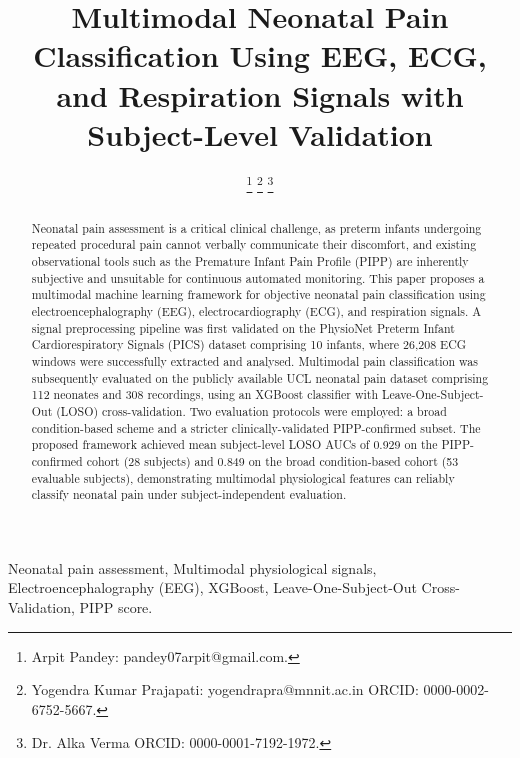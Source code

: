 \documentclass[conference]{IEEEtran}
\begin{document}
\title{ Multimodal Neonatal Pain Classification Using EEG, ECG, and Respiration Signals with Subject-Level Validation\\}


\author{


\thanks{Arpit Pandey: pandey07arpit@gmail.com.}
\thanks{Yogendra Kumar Prajapati: yogendrapra@mnnit.ac.in ORCID: 0000-0002-6752-5667.}
\thanks{Dr. Alka Verma ORCID: 0000-0001-7192-1972.}
}

\maketitle

\begin{abstract}
Neonatal pain assessment is a critical clinical challenge, as preterm infants undergoing repeated procedural pain cannot verbally communicate their discomfort, and existing observational tools such as the Premature Infant Pain Profile (PIPP) are inherently subjective and unsuitable for continuous automated monitoring. This paper proposes a multimodal machine learning framework for objective neonatal pain classification using electroencephalography (EEG), electrocardiography (ECG), and respiration signals. A signal preprocessing pipeline was first validated on the PhysioNet Preterm Infant Cardiorespiratory Signals (PICS) dataset comprising 10 infants, where 26,208 ECG windows were successfully extracted and analysed. Multimodal pain classification was subsequently evaluated on the publicly available UCL neonatal pain dataset comprising 112 neonates and 308 recordings, using an XGBoost classifier with Leave-One-Subject-Out (LOSO) cross-validation. Two evaluation protocols were employed: a broad condition-based scheme and a stricter clinically-validated PIPP-confirmed subset. The proposed framework achieved mean subject-level LOSO AUCs of 0.929 on the PIPP-confirmed cohort (28 subjects) and 0.849 on the broad condition-based cohort (53 evaluable subjects), demonstrating multimodal physiological features can reliably classify neonatal pain under subject-independent evaluation.

\end{abstract}
\begin{IEEEkeywords}
Neonatal pain assessment, Multimodal physiological signals, Electroencephalography (EEG), XGBoost, Leave-One-Subject-Out Cross-Validation, PIPP score.

\end{IEEEkeywords}
\end{document}
